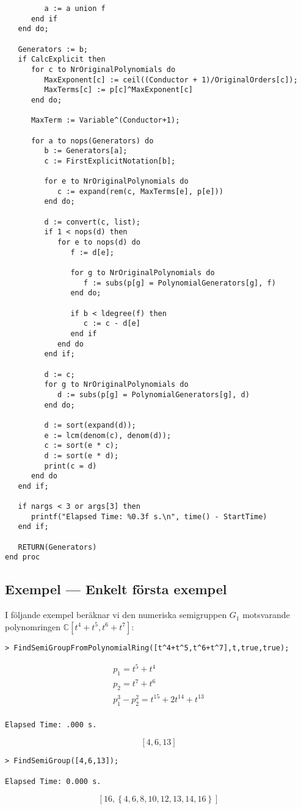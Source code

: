 \begin{verbatim}
         a := a union f
      end if
   end do;

   Generators := b;
   if CalcExplicit then
      for c to NrOriginalPolynomials do
         MaxExponent[c] := ceil((Conductor + 1)/OriginalOrders[c]);
         MaxTerms[c] := p[c]^MaxExponent[c]
      end do;

      MaxTerm := Variable^(Conductor+1);

      for a to nops(Generators) do
         b := Generators[a];
         c := FirstExplicitNotation[b];

         for e to NrOriginalPolynomials do
            c := expand(rem(c, MaxTerms[e], p[e]))
         end do;

         d := convert(c, list);
         if 1 < nops(d) then
            for e to nops(d) do
               f := d[e];

               for g to NrOriginalPolynomials do
                  f := subs(p[g] = PolynomialGenerators[g], f)
               end do;

               if b < ldegree(f) then 
                  c := c - d[e] 
               end if
            end do
         end if;

         d := c;
         for g to NrOriginalPolynomials do
            d := subs(p[g] = PolynomialGenerators[g], d)
         end do;

         d := sort(expand(d));
         e := lcm(denom(c), denom(d));
         c := sort(e * c);
         d := sort(e * d);
         print(c = d)
      end do
   end if;

   if nargs < 3 or args[3] then
      printf("Elapsed Time: %0.3f s.\n", time() - StartTime)
   end if;

   RETURN(Generators)
end proc
\end{verbatim}

\subsection{Exempel --- Enkelt första exempel}
\label{SimplePolynomialRingExample}

I följande exempel beräknar vi den numeriska semigruppen $G_1$ motsvarande polynomringen $\mathbb{C}\left[t^4 + t^5, t^6 + t^7\right]$:

\begin{verbatim}
> FindSemiGroupFromPolynomialRing([t^4+t^5,t^6+t^7],t,true,true);
\end{verbatim}
\[\begin{array}{c}
p_1 = t^5 + t^4\\[3pt]
p_2 = t^7 + t^6\\[3pt]
p_1^3 - p_2^2 = t^{15} + 2 t^{14} + t^{13}\\
\end{array}\]
\begin{verbatim}
Elapsed Time: .000 s.
\end{verbatim}
\[\left[4, 6, 13\right]\]
\begin{verbatim}
> FindSemiGroup([4,6,13]);

Elapsed Time: 0.000 s.
\end{verbatim}
\[\left[16, \left\{4, 6, 8, 10, 12, 13, 14, 16\right\}\right]\]

